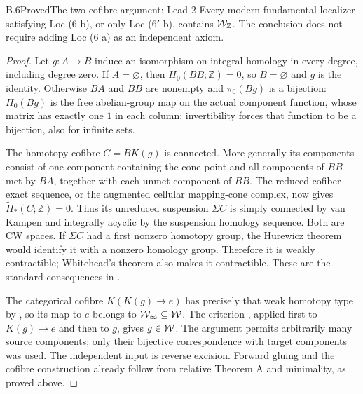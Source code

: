 \begin{claim}{B.6}{Proved}{The two-cofibre argument: Lead 2}
Every modern fundamental localizer satisfying Loc (6 b), or only Loc ($6'$ b), contains $\mathcal{W}_{\mathbb Z}$. The conclusion does not require adding Loc (6 a) as an independent axiom.
\end{claim}
\begin{proof}
Let $g:A\to B$ induce an isomorphism on integral homology in every degree, including degree zero. If $A=\varnothing$, then $H_0(BB;\mathbb Z)=0$, so $B=\varnothing$ and $g$ is the identity. Otherwise $BA$ and $BB$ are nonempty and $\pi_0(Bg)$ is a bijection: $H_0(Bg)$ is the free abelian-group map on the actual component function, whose matrix has exactly one $1$ in each column; invertibility forces that function to be a bijection, also for infinite sets.

The homotopy cofibre $C=BK(g)$ is connected. More generally its components consist of one component containing the cone point and all components of $BB$ met by $BA$, together with each unmet component of $BB$. The reduced cofiber exact sequence, or the augmented cellular mapping-cone complex, now gives $\widetilde H_*(C;\mathbb Z)=0$. Thus its unreduced suspension $\Sigma C$ is simply connected by van Kampen and integrally acyclic by the suspension homology sequence. Both are CW spaces. If $\Sigma C$ had a first nonzero homotopy group, the Hurewicz theorem would identify it with a nonzero homology group. Therefore it is weakly contractible; Whitehead's theorem also makes it contractible. These are the standard consequences in \citet[Theorem 4.32 and Corollary 4.33]{RootHatcher2002}.

The categorical cofibre $K(K(g)\to e)$ has precisely that weak homotopy type by , so its map to $e$ belongs to $\mathcal{W}_{\infty}\subseteq\mathcal{W}$. The criterion , applied first to $K(g)\to e$ and then to $g$, gives $g\in\mathcal{W}$. The argument permits arbitrarily many source components; only their bijective correspondence with target components was used. The independent input is reverse excision. Forward gluing and the cofibre construction already follow from relative Theorem A and minimality, as proved above.
\end{proof}

